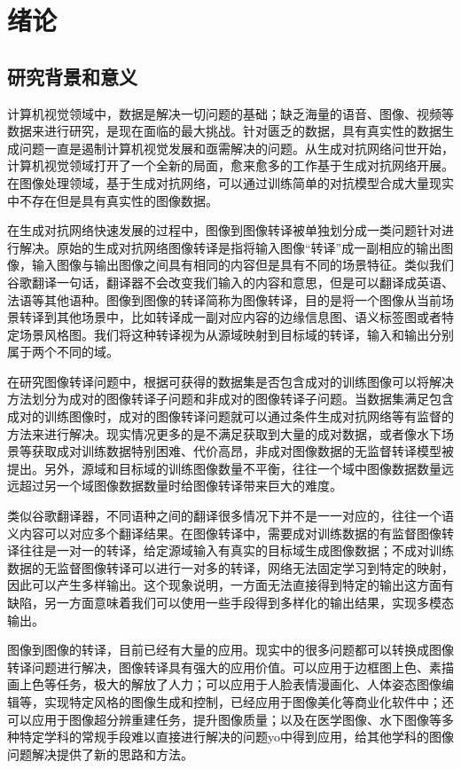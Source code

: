\chapter{绪论}
\section{研究背景和意义}
计算机视觉领域中，数据是解决一切问题的基础；缺乏海量的语音、图像、视频等数据来进行研究，是现在面临的最大挑战。针对匮乏的数据，具有真实性的数据生成问题一直是遏制计算机视觉发展和亟需解决的问题。从生成对抗网络问世开始，计算机视觉领域打开了一个全新的局面，愈来愈多的工作基于生成对抗网络开展。在图像处理领域，基于生成对抗网络，可以通过训练简单的对抗模型合成大量现实中不存在但是具有真实性的图像数据。

在生成对抗网络快速发展的过程中，图像到图像转译被单独划分成一类问题针对进行解决。原始的生成对抗网络图像转译是指将输入图像“转译”成一副相应的输出图像，输入图像与输出图像之间具有相同的内容但是具有不同的场景特征。类似我们谷歌翻译一句话，翻译器不会改变我们输入的内容和意思，但是可以翻译成英语、法语等其他语种。图像到图像的转译简称为图像转译，目的是将一个图像从当前场景转译到其他场景中，比如转译成一副对应内容的边缘信息图、语义标签图或者特定场景风格图。我们将这种转译视为从源域映射到目标域的转译，输入和输出分别属于两个不同的域。

在研究图像转译问题中，根据可获得的数据集是否包含成对的训练图像可以将解决方法划分为成对的图像转译子问题和非成对的图像转译子问题。当数据集满足包含成对的训练图像时，成对的图像转译问题就可以通过条件生成对抗网络等有监督的方法来进行解决。现实情况更多的是不满足获取到大量的成对数据，或者像水下场景等获取成对训练数据特别困难、代价高昂，非成对图像数据的无监督转译模型被提出。另外，源域和目标域的训练图像数量不平衡，往往一个域中图像数据数量远远超过另一个域图像数据数量时给图像转译带来巨大的难度。

类似谷歌翻译器，不同语种之间的翻译很多情况下并不是一一对应的，往往一个语义内容可以对应多个翻译结果。在图像转译中，需要成对训练数据的有监督图像转译往往是一对一的转译，给定源域输入有真实的目标域生成图像数据；不成对训练数据的无监督图像转译可以进行一对多的转译，网络无法固定学习到特定的映射，因此可以产生多样输出。这个现象说明，一方面无法直接得到特定的输出这方面有缺陷，另一方面意味着我们可以使用一些手段得到多样化的输出结果，实现多模态输出。

图像到图像的转译，目前已经有大量的应用。现实中的很多问题都可以转换成图像转译问题进行解决，图像转译具有强大的应用价值。可以应用于边框图上色、素描画上色等任务，极大的解放了人力；可以应用于人脸表情漫画化、人体姿态图像编辑等，实现特定风格的图像生成和控制，已经应用于图像美化等商业化软件中；还可以应用于图像超分辨重建任务，提升图像质量；以及在医学图像、水下图像等多种特定学科的常规手段难以直接进行解决的问题yo中得到应用，给其他学科的图像问题解决提供了新的思路和方法。

